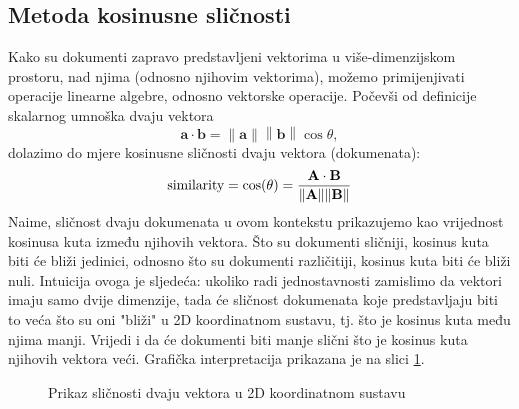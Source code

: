 \documentclass[times, utf8, zavrsni]{fer}
\begin{document}
\subsection{Metoda kosinusne sličnosti}
Kako su dokumenti zapravo predstavljeni vektorima u više-dimenzijskom prostoru, nad njima (odnosno njihovim vektorima), možemo primijenjivati operacije linearne algebre, odnosno vektorske operacije. Počevši od definicije skalarnog umnoška dvaju vektora
\begin{equation}
\mathbf {a} \cdot \mathbf {b} =\left\|\mathbf {a} \right\|\left\|\mathbf {b} \right\|\cos \theta,
\end{equation}
dolazimo do mjere kosinusne sličnosti dvaju vektora (dokumenata):
\begin{equation}
{\text{similarity}}=\cos(\theta )={\mathbf {A} \cdot \mathbf {B}  \over \|\mathbf {A} \|\|\mathbf {B}\|}
\end{equation}
Naime, sličnost dvaju dokumenata u ovom kontekstu prikazujemo kao vrijednost kosinusa kuta između njihovih vektora. Što su dokumenti sličniji, kosinus kuta biti će bliži jedinici, odnosno što su dokumenti različitiji, kosinus kuta biti će bliži nuli. Intuicija ovoga je sljedeća: ukoliko radi jednostavnosti zamislimo da vektori imaju samo dvije dimenzije, tada će sličnost dokumenata koje predstavljaju biti to veća što su oni "bliži" u 2D koordinatnom sustavu, tj. što je kosinus kuta među njima manji. Vrijedi i da će dokumenti biti manje slični što je kosinus kuta njihovih vektora veći. Grafička interpretacija prikazana je na slici
\ref{fig:vectors}.

\begin{figure}
\caption{Prikaz sličnosti dvaju vektora u 2D koordinatnom sustavu}
\label{fig:vectors}
\end{figure}
\end{document}

